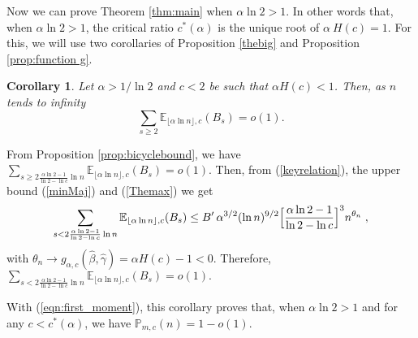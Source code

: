 \documentclass[aop,noinfoline]{imsart}
\newtheorem{corollary}[theorem]{Corollary}
\renewcommand{\Box}{{\vrule width0.6ex height1em depth0cm}}
\newenvironment{proof}{\noindent{\bf Proof:}}{\hfill \Box}
\newcommand{\EE}{\mathbb{E}}
\newcommand{\pmc}{\mathbb{P}_{m,c}}
\renewcommand{\hat}{\widehat}
\begin{document}
Now we can prove  Theorem \ref{thm:main} when $\alpha\ln 2>1$. In other words that,  when  
$ \alpha \ln 2>1$, the critical ratio $c^{*}(\alpha)$ is  the unique root of  $\alpha \ H(c)=1.$ For this,  we will use  two  corollaries of Proposition \ref{thebig} and Proposition \ref{prop:function g}.
\begin{corollary}\label{lowerbound}
Let $\alpha>1/\ln 2$ and $c< 2$ be such that $\alpha H(c)<1$.  Then, as $n$ tends to infinity 
$$\sum_{s\ge 2} \EE_{\lfloor \alpha \ln n \rfloor, c} (B_s) = o(1).$$ 
\end{corollary}
\begin{proof} From Proposition \ref {prop:bicyclebound}, we have $\displaystyle \sum_{s\ge 2 \frac{\alpha \ln 2 -1}{\ln 2 -\ln c} \ln n }\EE_{\lfloor \alpha \ln n \rfloor, c} (B_s) = o(1).$ Then, from (\ref {keyrelation}), the upper bound (\ref {minMaj}) and (\ref{Themax}) we get 
 $$\sum_{s< 2 \frac{\alpha \ln 2 -1}{\ln 2 -\ln c} \ln n }\EE_{\lfloor
   \alpha \ln n \rfloor, c} (B_s) \le B'\,  \alpha^{3/2} (\ln n)^{9/2}
 \Bigl [\frac{\alpha \ln 2 -1}{\ln 2 -\ln c}\Bigr ]^3 n^{\theta_n}\;,$$
 with $\theta_n \to g_{\alpha, c}(\hat{\beta}, \hat{\gamma})=\alpha H(c)  -1<0$. Therefore,
  $\displaystyle \sum_{s< 2 \frac{\alpha \ln 2 -1}{\ln 2 -\ln c} \ln n }\EE_{\lfloor \alpha \ln n \rfloor, c} (B_s) = o(1).$
\end{proof}\medskip

With (\ref{eqn:first_moment}), this corollary  proves that,  when $\alpha \ln 2>1$ and   for any $c<c^{*}(\alpha)$, we have  $\pmc(n)=1-o(1)$. \smallskip
\end{document}
